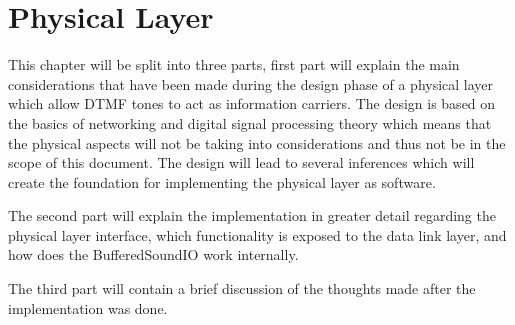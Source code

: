 \chapter{Physical Layer}\label{chap:physical}
This chapter will be split into three parts, first part will explain the main considerations that have been made during the design phase of a physical layer which allow DTMF tones to act as information carriers. The design is based on the basics of networking and digital signal processing theory which means that the physical aspects will not be taking into considerations and thus not be in the scope of this document. The design will lead to several inferences which will create the foundation for implementing the physical layer as software.

The second part will explain the implementation in greater detail regarding the physical layer interface, which functionality is exposed to the data link layer, and how does the BufferedSoundIO work internally.

The third part will contain a brief discussion of the thoughts made after the implementation was done.

